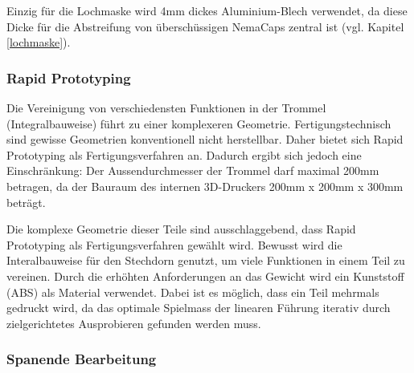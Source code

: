 Einzig für die Lochmaske wird 4mm dickes Aluminium-Blech verwendet, da diese Dicke für die Abstreifung von überschüssigen NemaCaps zentral ist (vgl. Kapitel \ref{lochmaske}).

\subsubsection{Rapid Prototyping}

Die Vereinigung von verschiedensten Funktionen in der Trommel (Integralbauweise) führt zu einer komplexeren Geometrie. Fertigungstechnisch sind gewisse Geometrien konventionell nicht herstellbar. Daher bietet sich Rapid Prototyping als Fertigungsverfahren an. Dadurch ergibt sich jedoch eine Einschränkung: Der Aussendurchmesser der Trommel darf maximal 200mm betragen, da der Bauraum des internen 3D-Druckers 200mm x 200mm x 300mm beträgt. 

Die komplexe Geometrie dieser Teile sind ausschlaggebend, dass Rapid Prototyping als Fertigungsverfahren gewählt wird. Bewusst wird die Interalbauweise für den Stechdorn genutzt, um viele Funktionen in einem Teil zu vereinen. Durch die erhöhten Anforderungen an das Gewicht wird ein Kunststoff (ABS) als Material verwendet. Dabei ist es möglich, dass ein Teil mehrmals gedruckt wird, da das optimale Spielmass der linearen Führung iterativ durch zielgerichtetes Ausprobieren gefunden werden muss. 

\subsubsection{Spanende Bearbeitung}